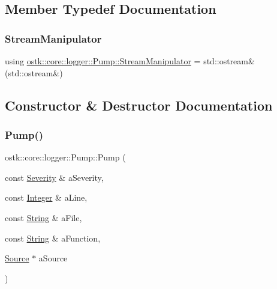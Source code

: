 \subsection{Member Typedef Documentation}
\mbox{\label{classostk_1_1core_1_1logger_1_1_pump_a76c2ff8c48c3484e3ca179667a7a7b31}} 
\subsubsection{\texorpdfstring{Stream\+Manipulator}{StreamManipulator}}
{\footnotesize\ttfamily using \hyperlink{classostk_1_1core_1_1logger_1_1_pump_a76c2ff8c48c3484e3ca179667a7a7b31}{ostk\+::core\+::logger\+::\+Pump\+::\+Stream\+Manipulator} =  std\+::ostream\&(std\+::ostream\&)}



\subsection{Constructor \& Destructor Documentation}
\mbox{\label{classostk_1_1core_1_1logger_1_1_pump_a0a637b6f2ae5ac6b0bd9a55880bddfb8}} 
\subsubsection{\texorpdfstring{Pump()}{Pump()}\hspace{0.1cm}{\footnotesize\ttfamily [1/3]}}
{\footnotesize\ttfamily ostk\+::core\+::logger\+::\+Pump\+::\+Pump (\begin{DoxyParamCaption}\item[{const \hyperlink{namespaceostk_1_1core_1_1logger_a52d02954e094391f067befffe7f3cae9}{Severity} \&}]{a\+Severity,  }\item[{const \hyperlink{classostk_1_1core_1_1types_1_1_integer}{Integer} \&}]{a\+Line,  }\item[{const \hyperlink{classostk_1_1core_1_1types_1_1_string}{String} \&}]{a\+File,  }\item[{const \hyperlink{classostk_1_1core_1_1types_1_1_string}{String} \&}]{a\+Function,  }\item[{\hyperlink{classostk_1_1core_1_1logger_1_1_source}{Source} $\ast$}]{a\+Source }\end{DoxyParamCaption})}

